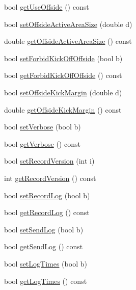 \begin{DoxyCompactItemize}
\item 
bool \hyperlink{classServerSettings_a0d6e9968399d5c07aac912615eccc5c7}{get\+Use\+Offside} () const 
\item 
bool \hyperlink{classServerSettings_a91fe86f0a25411b67c35974872d1bcfe}{set\+Offside\+Active\+Area\+Size} (double d)
\item 
double \hyperlink{classServerSettings_ac72bd2dc946a31d4ab5688263f39fc36}{get\+Offside\+Active\+Area\+Size} () const 
\item 
bool \hyperlink{classServerSettings_a6acffd58c850f6870cbbc60b04f6d77f}{set\+Forbid\+Kick\+Off\+Offside} (bool b)
\item 
bool \hyperlink{classServerSettings_ac58e50ab3445d43a41c10a3f654ac349}{get\+Forbid\+Kick\+Off\+Offside} () const 
\item 
bool \hyperlink{classServerSettings_a2575a4a97478ba34bf40e7b1ef776502}{set\+Offside\+Kick\+Margin} (double d)
\item 
double \hyperlink{classServerSettings_ac9c5d2d3786da204c2932229f536a47f}{get\+Offside\+Kick\+Margin} () const 
\item 
bool \hyperlink{classServerSettings_add8bbf7b3915098d544dd6aa36a34380}{set\+Verbose} (bool b)
\item 
bool \hyperlink{classServerSettings_a7366fa584c5ddd63e3a8afd0ac2c3da2}{get\+Verbose} () const 
\item 
bool \hyperlink{classServerSettings_a24b88ba444bab9d41ca23dd175993a61}{set\+Record\+Version} (int i)
\item 
int \hyperlink{classServerSettings_aff2312687e28b90cac35fa6b97161757}{get\+Record\+Version} () const 
\item 
bool \hyperlink{classServerSettings_aade52919304fcf81331dad3ac221c072}{set\+Record\+Log} (bool b)
\item 
bool \hyperlink{classServerSettings_ac2ad8593d56dc8791550e5ac678365dd}{get\+Record\+Log} () const 
\item 
bool \hyperlink{classServerSettings_ad39466625b0f21bcf8a509fb22e7c694}{set\+Send\+Log} (bool b)
\item 
bool \hyperlink{classServerSettings_a3d56bffd30bab022ea3b56768cbb03dc}{get\+Send\+Log} () const 
\item 
bool \hyperlink{classServerSettings_adada5579b234820ef3965c193a3cd07b}{set\+Log\+Times} (bool b)
\item 
bool \hyperlink{classServerSettings_a2fe5ce14ebe2d520b3bbbc3980c7b2c8}{get\+Log\+Times} () const 
\item 

\end{DoxyCompactItemize}
